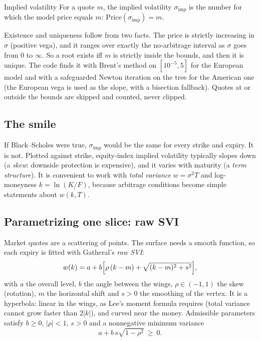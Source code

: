 \documentclass[11pt]{article}
\begin{document}
\begin{defn}{Implied volatility}
For a quote $m$, the implied volatility $\sigma_{\mathrm{imp}}$ is the number for
which the model price equals $m$: $\mathrm{Price}(\sigma_{\mathrm{imp}})=m$.
\end{defn}

Existence and uniqueness follow from two facts. The price is strictly increasing
in $\sigma$ (positive vega), and it ranges over exactly the no-arbitrage interval
as $\sigma$ goes from 0 to $\infty$. So a root exists iff $m$ is strictly inside
the bounds, and then it is unique. The code finds it with Brent's method on
$[10^{-5},5]$ for the European model and with a safeguarded Newton iteration on
the tree for the American one (the European vega is used as the slope, with a
bisection fallback). Quotes at or outside the bounds are skipped and counted,
never clipped.

\subsection{The smile}

If Black--Scholes were true, $\sigma_{\mathrm{imp}}$ would be the same for every
strike and expiry. It is not. Plotted against strike, equity-index implied
volatility typically slopes down (a \emph{skew}: downside protection is
expensive), and it varies with maturity (a \emph{term structure}). It is
convenient to work with \emph{total variance} $w=\sigma^2T$ and log-moneyness
$k=\ln(K/F)$, because arbitrage conditions become simple statements about
$w(k,T)$.

\subsection{Parametrizing one slice: raw SVI}\label{sec:svi-theory}

Market quotes are a scattering of points. The surface needs a smooth function, so
each expiry is fitted with Gatheral's \emph{raw SVI}:
\begin{equation}\label{eq:svi}
  w(k)=a+b\Bigl[\rho\,(k-m)+\sqrt{(k-m)^2+s^2}\Bigr],
\end{equation}
with $a$ the overall level, $b$ the angle between the wings, $\rho\in(-1,1)$ the
skew (rotation), $m$ the horizontal shift and $s>0$ the smoothing of the vertex.
It is a hyperbola: linear in the wings, as Lee's moment formula requires
(total variance cannot grow faster than $2|k|$), and curved near the money.
Admissible parameters satisfy $b\ge0$, $|\rho|<1$, $s>0$ and a nonnegative
minimum variance
\begin{equation}
  a+b\,s\sqrt{1-\rho^2}\ \ge\ 0 .
\end{equation}
\end{document}
